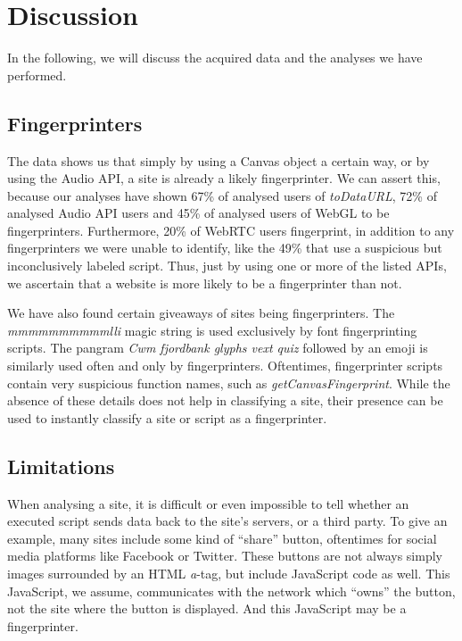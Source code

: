 \documentclass[
    fontsize=12pt,
    headings=small,
    parskip=half,
    bibliography=totoc,
    numbers=noenddot,
    open=any
    ]{scrreprt}
\begin{document}
\section{Discussion}
\label{sec:data_discussion}
In the following, we will discuss the acquired data and the analyses we have performed.

\subsection{Fingerprinters}
The data shows us that simply by using a Canvas object a certain way, or by using the Audio API,
a site is already a likely fingerprinter. We can assert this, because our analyses have shown
67\% of analysed users of \textit{toDataURL}, 72\% of analysed Audio API users and 45\%
of analysed users of WebGL to be fingerprinters.
Furthermore, 20\% of WebRTC users fingerprint, in addition to any fingerprinters we were unable
to identify, like the 49\% that use a suspicious but inconclusively labeled script.
Thus, just by using one or more of the listed APIs, we ascertain that a website is more likely
to be a fingerprinter than not.

We have also found certain giveaways of sites being fingerprinters.
The \textit{mmmmmmmmmmlli} magic string is used exclusively by font fingerprinting scripts.
The pangram \textit{Cwm fjordbank glyphs vext quiz} followed by an emoji is similarly used often
and only by fingerprinters.
Oftentimes, fingerprinter scripts contain very suspicious function names, such as \textit{getCanvasFingerprint}.
While the absence of these details does not help in classifying a site,
their presence can be used to instantly classify a site or script as a fingerprinter.


\subsection{Limitations}
When analysing a site, it is difficult or even impossible to tell whether an executed
script sends data back to the site's servers, or a third party.
To give an example, many sites include some kind of ``share'' button,
oftentimes for social media platforms like Facebook or Twitter.
These buttons are not always simply images surrounded by an HTML \textit{a}-tag,
but include JavaScript code as well.
This JavaScript, we assume, communicates with the network which ``owns''
the button, not the site where the button is displayed.
And this JavaScript may be a fingerprinter.
\end{document}

